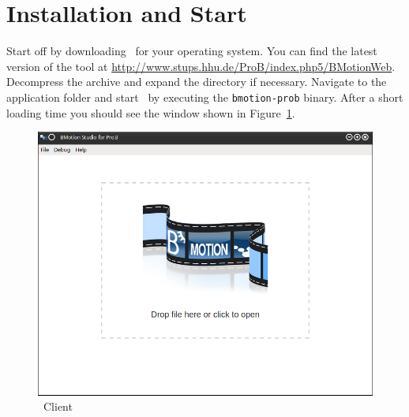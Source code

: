\section{Installation and Start}
\label{installation}

Start off by downloading \bms~for your operating system.
You can find the latest version of the tool at \url{http://www.stups.hhu.de/ProB/index.php5/BMotionWeb}.
Decompress the archive and expand the directory if necessary.
%
%
Navigate to the application folder and start \bms~by executing the \texttt{bmotion-prob} binary.
After a short loading time you should see the window shown in Figure~\ref{fig_bms_client}.

\begin{figure}[!ht]
\begin{center}
	\includegraphics[width=.8\textwidth]{img/tutorial/clientstartscreen.png}
	\caption{\bms\ Client}
	\label{fig_bms_client}
\end{center}
\end{figure}



